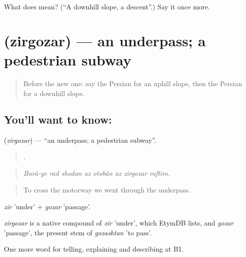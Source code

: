 \begin{tcolorbox}[breakable,colback=teal!4,colframe=teal!35!black,title={Before you move on}]
What does  mean? (\textquotedblleft{}A downhill slope, a descent\textquotedblright{}.) Say it once more.
\end{tcolorbox}
\section[\texorpdfstring{\fa{زیرگذر} (zirgozar)}{زیرگذر (zirgozar)}]{ (zirgozar) — an underpass; a pedestrian subway}

\label{lesson:FA-C448-zirgozar}



\begin{quote}
Before the new one: say the Persian for an uphill slope, then the Persian for a downhill slope.
\end{quote}

\subsection*{You'll want to know: }
\textbf{} (\emph{zirgozar}) — \textquotedblleft{}an underpass; a pedestrian subway\textquotedblright{}.

\begin{quote}
       .
\end{quote}

\begin{quote}
\emph{Barâ-ye rad shodan az otobân az zirgozar raftim.}
\end{quote}

\begin{quote}
To cross the motorway we went through the underpass.
\end{quote}

\emph{zir} 'under' + \emph{gozar} 'passage'.

\begin{cousinweb}
\emph{zirgozar} is a native compound of \emph{zir} 'under', which EtymDB lists, and \emph{gozar} 'passage', the present stem of \emph{gozashtan} 'to pass'.
\end{cousinweb}

\begin{grammarlens}[title={What you've built}]
One more word for telling, explaining and describing at B1.
\end{grammarlens}

